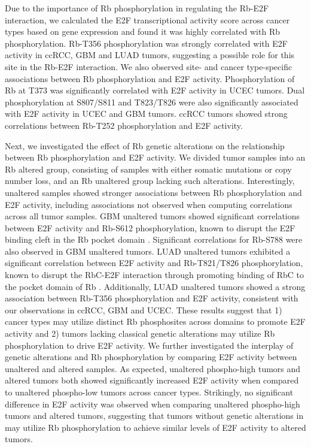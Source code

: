 Due to the importance of Rb phosphorylation in regulating the Rb-E2F interaction, we calculated the E2F transcriptional activity score across cancer types based on gene expression and found it was highly correlated with Rb phosphorylation. Rb-T356 phosphorylation was strongly correlated with E2F activity in ccRCC, GBM and LUAD tumors, suggesting a possible role for this site in the Rb-E2F interaction. We also observed site- and cancer type-specific associations between Rb phosphorylation and E2F activity. Phosphorylation of Rb at T373 was significantly correlated with E2F activity in UCEC tumors. Dual phosphorylation at S807/S811 and T823/T826 were also significantly associated with E2F activity in UCEC and GBM tumors. ccRCC tumors showed strong correlations between Rb-T252 phosphorylation and E2F activity.

Next, we investigated the effect of Rb genetic alterations on the relationship between Rb phosphorylation and E2F activity. We divided tumor samples into an Rb altered group, consisting of samples with either  somatic mutations or copy number loss, and an Rb unaltered group lacking such alterations. Interestingly, unaltered samples showed stronger associations between Rb phosphorylation and E2F activity, including associations not observed when computing correlations across all tumor samples. GBM unaltered tumors showed significant correlations between E2F activity and Rb-S612 phosphorylation, known to disrupt the E2F binding cleft in the Rb pocket domain \cite{macdonaldji_dickfa:PosttranslationalModifications2012}. Significant correlations for Rb-S788 were also observed in GBM unaltered tumors. LUAD unaltered tumors exhibited a significant correlation between E2F activity and Rb-T821/T826 phosphorylation, known to disrupt the RbC-E2F interaction through promoting binding of RbC to the pocket domain of Rb \cite{rubinsm_pavletichnp:StructureRb2005}. Additionally, LUAD unaltered tumors showed a strong association between Rb-T356 phosphorylation and E2F activity, consistent with our observations in ccRCC, GBM and UCEC. These results suggest that 1) cancer types may utilize distinct Rb phosphosites across domains to promote E2F activity and 2) tumors lacking classical  genetic alterations may utilize Rb phosphorylation to drive E2F activity. We further investigated the interplay of  genetic alterations and Rb phosphorylation by comparing E2F activity between unaltered and altered samples. As expected, unaltered phospho-high tumors and altered tumors both showed significantly increased E2F activity when compared to unaltered phospho-low tumors across cancer types. Strikingly, no significant difference in E2F activity was observed when comparing unaltered phospho-high tumors and altered tumors, suggesting that tumors without genetic alterations in  may utilize Rb phosphorylation to achieve similar levels of E2F activity to  altered tumors.


